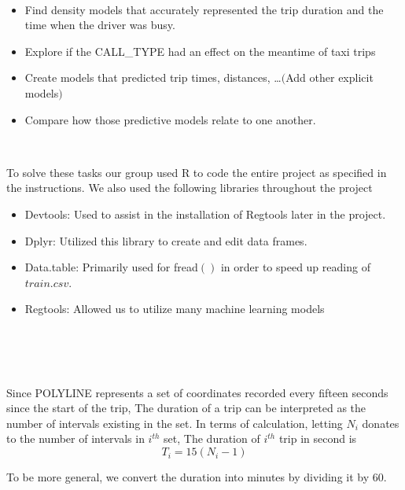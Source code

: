 \documentclass[11pt]{article}
\begin{document}
\\
\begin{itemize}
	\item Find density models that accurately represented the trip duration and the time when the driver was busy.
	\item Explore if the CALL\_TYPE had an effect on the meantime of taxi trips
	\item Create models that predicted trip times, distances, …$($Add other explicit models$)$
	\item Compare how those predictive models relate to one another.
\end{itemize}

\\
\par To solve these tasks our group used R to code the entire project as specified in the instructions.
 We also used the following libraries throughout the project

\begin{itemize}
	\item Devtools: Used to assist in the installation of Regtools later in the project.
	\item Dplyr: Utilized this library to create and edit data frames.
	\item Data.table: Primarily used for fread$()$ in order to speed up reading of \(train.csv\).
	\item Regtools: Allowed us to utilize many machine learning models
\end{itemize}

\\ \\
\\
\par
Since POLYLINE represents a set of coordinates recorded every fifteen seconds since the start of the trip,
 The duration of a trip can be interpreted as the number of intervals existing in the set. In terms of calculation,
 letting $N_i$ donates to the number of intervals in $i^{th}$ set, The duration of $i^{th}$ trip in second is
\begin{equation}
T_i = 15(N_i -1)
\end{equation}
\par
To be more general, we convert the duration into minutes by dividing it by 60.\\
\end{document}
